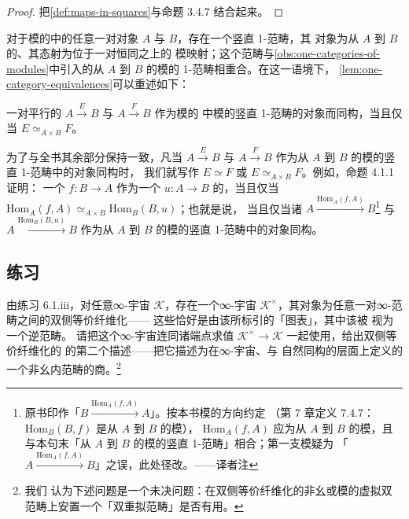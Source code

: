 \begin{proof}
把\cref{def:maps-in-squares}与命题 3.4.7 结合起来。
\end{proof}

对于模的\trVirtualDoubleCategory{}中的任意一对对象 $A$ 与 $B$，存在一个竖直 1-范畴，其
对象为从 $A$ 到 $B$ 的\trModule{}、其态射为位于一对恒同\trFunctor{}之上的
模映射；这个范畴与\cref{obs:one-categories-of-modules}中引入的从 $A$ 到
$B$ 的模的 1-范畴相重合。在这一语境下，%
\cref{lem:one-category-equivalences}可以重述如下：

\begin{lemma}\label{lem:module-vertical-isomorphism}
一对平行的\trModule{} $A\xrightarrow{E}B$ 与 $A\xrightarrow{F}B$ 作为模的%
\trVirtualDoubleCategory{}中模的竖直 1-范畴的对象而同构，当且仅当
$E\simeq_{A\times B}F$。
\end{lemma}

为了与全书其余部分保持一致，凡当\trModule{} $A\xrightarrow{E}B$ 与
$A\xrightarrow{F}B$ 作为从 $A$ 到 $B$ 的模的竖直 1-范畴中的对象同构时，
我们就写作 $E\simeq F$ 或 $E\simeq_{A\times B}F$。例如，命题 4.1.1 证明：
一个\trFunctor{} $f\colon B\to A$ 作为一个\trFunctor{} $u\colon A\to B$
的\trLeftAdjoint{}，当且仅当
$\mathrm{Hom}_{A}(f,A)\simeq_{A\times B}\mathrm{Hom}_{B}(B,u)$；也就是说，
当且仅当诸\trModule{} $A\xrightarrow{\mathrm{Hom}_{A}(f,A)}B$\footnote{%
原书印作「$B\xrightarrow{\mathrm{Hom}_{A}(f,A)}A$」。按本书模的方向约定
（第 7 章定义 7.4.7：$\mathrm{Hom}_{B}(B,f)$ 是从 $A$ 到 $B$ 的模），%
$\mathrm{Hom}_{A}(f,A)$ 应为从 $A$ 到 $B$ 的模，且与本句末「从 $A$ 到
$B$ 的模的竖直 1-范畴」相合；第一支模疑为
「$A\xrightarrow{\mathrm{Hom}_{A}(f,A)}B$」之误，此处径改。——译者注}
与 $A\xrightarrow{\mathrm{Hom}_{B}(B,u)}B$ 作为从 $A$ 到 $B$ 的模的竖直
1-范畴中的对象同构。

\subsection*{练习}

\begin{exercise}\label{ex:cosmos-of-two-sided-isofibrations}
由练习 6.1.iii，对任意∞-宇宙 $\mathcal{K}$，存在一个∞-宇宙
$\mathcal{K}^{\times}$，其对象为任意一对∞-范畴之间的双侧等价纤维化——
这些恰好是由该\trSpan{}所标引的「\trFibrant{}图表」，其中该\trSpan{}被
视为一个逆范畴。
请把这个∞-宇宙连同诸端点求值\trFunctor{}
$\mathcal{K}^{\times}\to\mathcal{K}$ 一起使用，给出双侧等价纤维化的\trDoubleCategory
的第二个描述——把它描述为在∞-宇宙、\trCosmologicalFunctor{}与%
\trSimplicial{}自然同构的层面上定义的一个非幺内范畴的商。\footnote{我们
认为下述问题是一个未决问题：在双侧等价纤维化的非幺\trDoubleCategory{}或模的虚拟双
范畴上安置一个「双重拟范畴」是否有用。}
\end{exercise}

